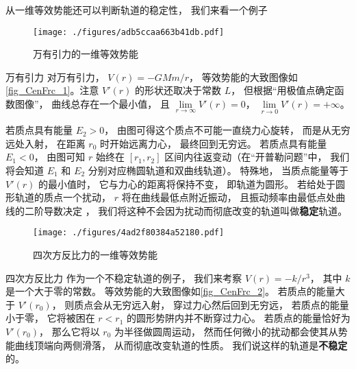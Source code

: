 从一维等效势能还可以判断轨道的稳定性， 我们来看一个例子

\begin{figure}[ht]
\centering
\texttt{[image: ./figures/adb5ccaa663b41db.pdf]}
\caption{万有引力的一维等效势能} \label{fig_CenFrc_1}
\end{figure}

\begin{example}{万有引力}
对万有引力， $V(r) = -GMm/r$， 等效势能的大致图像如\autoref{fig_CenFrc_1}。注意 $V'(r)$ 的形状还取决于常数 $L$， 但根据“用极值点确定函数图像”， 曲线总存在一个最小值， 且 $\lim\limits_{r\to\infty}V'(r) = 0$， $\lim\limits_{r\to 0} V'(r) = +\infty$。

若质点具有能量 $E_2 > 0$， 由图可得这个质点不可能一直绕力心旋转， 而是从无穷远处入射， 在距离 $r_0$ 时开始远离力心， 最终回到无穷远。 若质点具有能量 $E_1 < 0$， 由图可知 $r$ 始终在 $[r_1, r_2]$ 区间内往返变动（在“开普勒问题”中， 我们将会知道 $E_1$ 和 $E_2$ 分别对应椭圆轨道和双曲线轨道）。 特殊地， 当质点能量等于 $V'(r)$ 的最小值时， 它与力心的距离将保持不变， 即轨道为圆形。 若给处于圆形轨道的质点一个扰动， $r$ 将在曲线最低点附近振动， 且振动频率由最低点处曲线的二阶导数决定%
， 我们将这种不会因为扰动而彻底改变的轨道叫做\textbf{稳定}轨道。
\end{example}

\begin{figure}[ht]
\centering
\texttt{[image: ./figures/4ad2f80384a52180.pdf]}
\caption{四次方反比力的一维等效势能} \label{fig_CenFrc_2}
\end{figure}

\begin{example}{四次方反比力}
作为一个不稳定轨道的例子， 我们来考察 $V(r) = -k/r^3$， 其中 $k$ 是一个大于零的常数。 等效势能的大致图像如\autoref{fig_CenFrc_2}。 若质点的能量大于 $V'(r_0)$， 则质点会从无穷远入射， 穿过力心然后回到无穷远， 若质点的能量小于零， 它将被困在 $r < r_1$ 的圆形势阱内并不断穿过力心。 若质点的能量恰好为 $V'(r_0)$， 那么它将以 $r_0$ 为半径做圆周运动， 然而任何微小的扰动都会使其从势能曲线顶端向两侧滑落， 从而彻底改变轨道的性质。 我们说这样的轨道是\textbf{不稳定}的。
\end{example}
